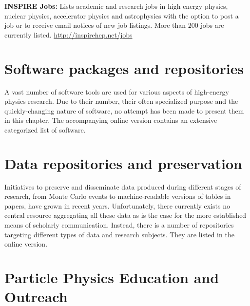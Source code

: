   \textbf{INSPIRE Jobs:} Lists academic and research jobs in high
  energy physics, nuclear physics, accelerator physics and astrophysics
  with the option to post a job or to receive email notices of new job
  listings. More than 200 jobs are currently listed.
  \url{http://inspirehep.net/jobs}

\section{Software packages and
repositories}\label{databases:sec:repositories}

A vast number of software tools are used for various aspects of high-energy
physics research. Due to their number, their often specialized purpose and the
quickly-changing nature of software, no attempt has been made to present them in this chapter.
The accompanying online version contains an extensive categorized list of software.

\section{Data repositories and preservation}\label{databases:sec:datarepositories}


Initiatives to preserve and disseminate data produced during different stages
of research, from Monte Carlo events to machine-readable versions of tables in
papers, have grown in recent years.  Unfortunately, there currently exists no
central resource aggregating all these data as is the case for the more
established means of scholarly communication. Instead, there is a number of
repositories targeting different types of data and research subjects. They are
listed in the online version.

\section{Particle Physics Education and Outreach
}\label{databases:sec:edusites}


